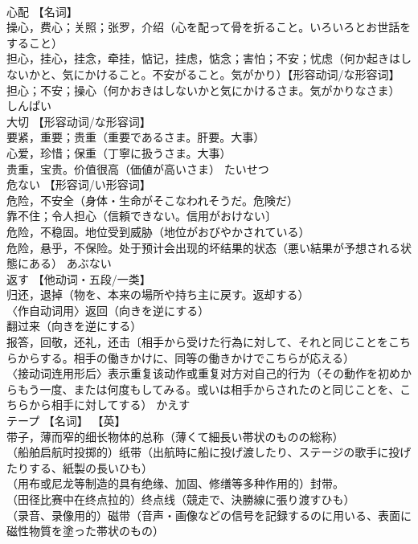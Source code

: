 \documentclass[8pt]{extreport}
\begin{document}
\begin{CJK}{UTF8}{min}
\\	心配	【名词】 
\\	操心，费心；关照；张罗，介绍（心を配って骨を折ること。いろいろとお世話をすること） 
\\	担心，挂心，挂念，牵挂，惦记，挂虑，惦念；害怕；不安；忧虑（何か起きはしないかと、気にかけること。不安がること。気がかり）【形容动词/な形容词】 担心；不安；操心（何かおきはしないかと気にかけるさま。気がかりなさま）	しんぱい	
\\	大切	【形容动词/な形容词】 
\\	要紧，重要；贵重（重要であるさま。肝要。大事） 
\\	心爱，珍惜；保重（丁寧に扱うさま。大事） 
\\	贵重，宝贵。价值很高（価値が高いさま）	たいせつ	
\\	危ない	【形容词/い形容词】 
\\	危险，不安全（身体・生命がそこなわれそうだ。危険だ） 
\\	靠不住；令人担心（信頼できない。信用がおけない〕 
\\	危险，不稳固。地位受到威胁（地位がおびやかされている） 
\\	危险，悬乎，不保险。处于预计会出现的坏结果的状态（悪い結果が予想される状態にある）	あぶない	
\\	返す	【他动词・五段/一类】 
\\	归还，退掉（物を、本来の場所や持ち主に戻す。返却する） 
\\	〈作自动词用〉返回（向きを逆にする） 
\\	翻过来（向きを逆にする） 
\\	报答，回敬，还礼，还击〔相手から受けた行為に対して、それと同じことをこちらからする。相手の働きかけに、同等の働きかけでこちらが応える） 
\\	〈接动词连用形后〉表示重复该动作或重复对方对自己的行为（その動作を初めからもう一度、または何度もしてみる。或いは相手からされたのと同じことを、こちらから相手に対してする）	かえす	
\\	テープ	【名词】 【英】
\\	带子，薄而窄的细长物体的总称（薄くて細長い帯状のものの総称） 
\\	（船舶启航时投掷的）纸带（出航時に船に投げ渡したり、ステージの歌手に投げたりする、紙製の長いひも） 
\\	（用布或尼龙等制造的具有绝缘、加固、修缮等多种作用的）封带。 
\\	（田径比赛中在终点拉的）终点线（競走で、決勝線に張り渡すひも） 
\\	（录音、录像用的）磁带（音声・画像などの信号を記録するのに用いる、表面に磁性物質を塗った帯状のもの） 

\end{CJK}
\end{document}

